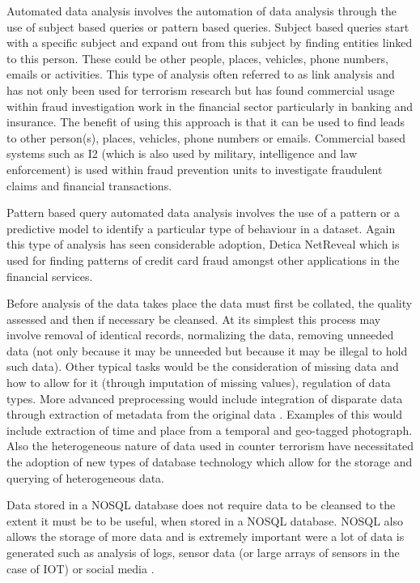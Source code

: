 Automated data analysis involves the automation of data analysis through the use of subject based queries or pattern based queries. Subject based queries start with a specific subject and expand out from this subject by finding entities linked to this person. These could be other people, places, vehicles, phone numbers, emails or activities. This type of analysis often referred to as link analysis \citep{berry1997data} and has not only been used for terrorism research but has found commercial usage within fraud investigation work in the financial sector particularly in banking and insurance. The benefit of using this approach is that it can be used to find leads to other person(s), places, vehicles, phone numbers or emails. Commercial based systems such as I2 \citep{i2Analyze2016} (which is also used by military, intelligence and law enforcement) is used within 
fraud prevention units to investigate fraudulent claims and financial transactions.

Pattern based query automated data analysis involves the use of a pattern or a predictive model to identify a particular type of behaviour in a dataset. Again this type of analysis has seen considerable adoption, Detica NetReveal \citep{oatley2011data} which is used for finding patterns of credit card fraud amongst other applications in the financial services.  

Before analysis of the data takes place the data must first be collated, the quality assessed and then if necessary be cleansed. At its simplest this process may involve removal of identical records, normalizing the data, removing unneeded data (not only because it may be unneeded but because it may be illegal to hold such data). Other typical tasks would be the consideration of missing data and how to allow for it (through imputation of missing values), regulation of data types. More advanced preprocessing would include integration of disparate data through extraction of metadata from the original data \citep{derosa2004data}. Examples of this would include extraction of  time and place from a temporal and geo-tagged photograph. Also the heterogeneous nature of data used in counter terrorism have necessitated the adoption of new types of database technology which allow for the storage and querying of heterogeneous data.  

Data stored in a NOSQL database does not require data to be cleansed to the extent it must be to be useful, when stored in a NOSQL database. NOSQL also allows the storage of more data and is extremely important were a lot of data is generated such as analysis of logs, sensor data (or large arrays of sensors in the case of IOT) or social media \citep{jeberson2015survey}.

